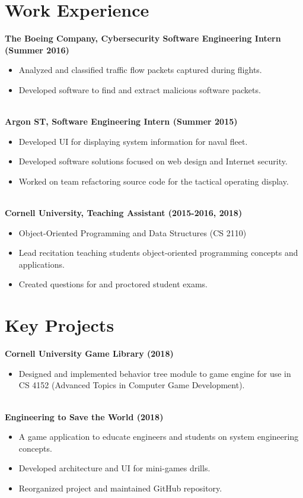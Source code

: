 \documentclass[article,8pt]{article}
\begin{document}
\section{Work Experience}
\textbf{The Boeing Company, Cybersecurity Software Engineering Intern (Summer 2016)}
\vspace{-0.5em}
\begin{itemize}
    \item Analyzed and classified traffic flow packets captured during flights.
    \item Developed software to find and extract malicious software packets.
\end{itemize}\\
\textbf{Argon ST, Software Engineering Intern (Summer 2015)}
\vspace{-0.5em}
\begin{itemize}
    \item Developed UI for displaying system information for naval fleet.
    \item Developed software solutions focused on web design and Internet security.
    \item Worked on team refactoring source code for the tactical operating display.
\end{itemize}\\
\textbf{Cornell University, Teaching Assistant (2015-2016, 2018)}
\vspace{-0.5em}
\begin{itemize}
    \item Object-Oriented Programming and Data Structures (CS 2110)
    \item Lead recitation teaching students object-oriented programming concepts and applications.
    \item Created questions for and proctored student exams.
\end{itemize}

\section{Key Projects}
\textbf{Cornell University Game Library (2018)}
\vspace{-0.5em}
\begin{itemize}
    \item Designed and implemented behavior tree module to game engine for use in CS 4152 (Advanced Topics in Computer Game Development).
\end{itemize}\\
\textbf{Engineering to Save the World (2018)}
\vspace{-0.5em}
\begin{itemize}
    \item A game application to educate engineers and students on system engineering concepts.
    \item Developed architecture and UI for mini-games drills.
    \item Reorganized project and maintained GitHub repository.
\end{itemize}
\end{document}
